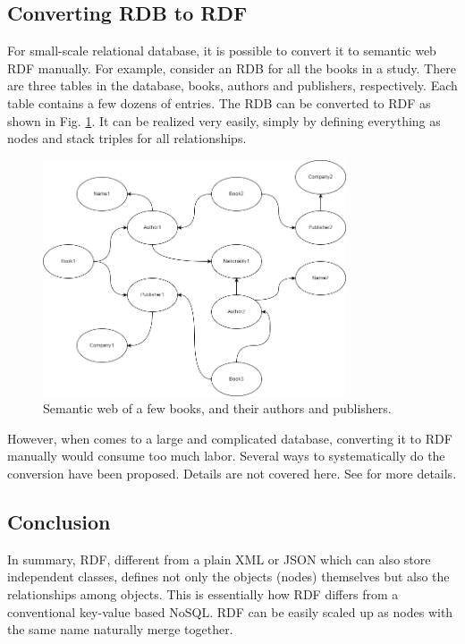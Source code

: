 \subsection{Converting RDB to RDF}

For small-scale relational database, it is possible to convert it to semantic web RDF manually. For example, consider an RDB for all the books in a study. There are three tables in the database, books, authors and publishers, respectively. Each table contains a few dozens of entries. The RDB can be converted to RDF as shown in Fig. \ref{fig:bookexp}. It can be realized very easily, simply by defining everything as nodes and stack triples for all relationships.
\begin{figure}[htbp]
	\centering
	\includegraphics[width=0.8\textwidth]{./chapters/ch-semanticwebarchitecture/figures/bookexp.png}
	\caption{Semantic web of a few books, and their authors and publishers.}
	\label{fig:bookexp}
\end{figure}

However, when comes to a large and complicated database, converting it to RDF manually would consume too much labor. Several ways to systematically do the conversion have been proposed. Details are not covered here. See \cite{michel2014survey} for more details.

\subsection{Conclusion}

In summary, RDF, different from a plain XML or JSON which can also store independent classes, defines not only the objects (nodes) themselves but also the relationships among objects. This is essentially how RDF differs from a conventional key-value based NoSQL. RDF can be easily scaled up as nodes with the same name naturally merge together.

